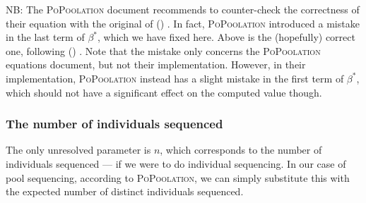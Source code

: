 \documentclass[letterpaper,fontsize=9pt,DIV=12]{scrartcl}
\newcounter{popoolissue}
\newcommand\popoolissue[1]{}
\newcommand\citeay[1]{\citeauthor{#1} (\citeyear{#1}) \cite{#1}}
\newcommand\toolname{\textsc}
\begin{document}
NB: The \toolname{PoPoolation} document recommends to counter-check the correctness of their equation with the original of \citeay{Achaz2008}.
In fact, \toolname{PoPoolation}  introduced a mistake in the last term of $\beta^*$,
which we have fixed here. Above is the (hopefully) correct one, following \citeay{Achaz2008}.
Note that the mistake only concerns the \toolname{PoPoolation}  equations document, but not their implementation.
However, in their implementation, \toolname{PoPoolation} instead has a slight mistake in the first term of $\beta^*$, which should not have a significant effect on the computed value though.

\popoolissue{The above is indeed not a big one, but we thought it's good to mention it.}

\popoolissue{A more serious issue occurred in the computation of alpha*. The code actually computes this as beta*, and never calls the actual alpha* function, see \href{https://github.com/lczech/popoolation/blob/092e7a6f7ee4910c1bec4377e0adccc353175bc8/Modules/VarMath.pm\#L104}{here}. This is a bug that Robert and I have discussed before, and I think it is fixed now.}

\popoolissue{Another small issue: The computation of alpha* requires ``effective coverage'' (read depth) to be larger than 1, see \href{https://github.com/lczech/popoolation/blob/092e7a6f7ee4910c1bec4377e0adccc353175bc8/Modules/VarMath.pm\#L226}{here}, but tests this against $n$, which is the number of individuals. Are we missing something here?}

\popoolissue{Furthermore, we tested the computation of alpha*, and it also gives NaN values for input 2 and 3, so the test should in fact be $>= 4$ instead.}


\subsubsection*{The number of individuals sequenced}

The only unresolved parameter is $n$, which corresponds to the number of individuals sequenced ---
if we were to do individual sequencing.
In our case of pool sequencing, according to \toolname{PoPoolation},
we can simply substitute this with the expected number of distinct individuals sequenced.
\end{document}
